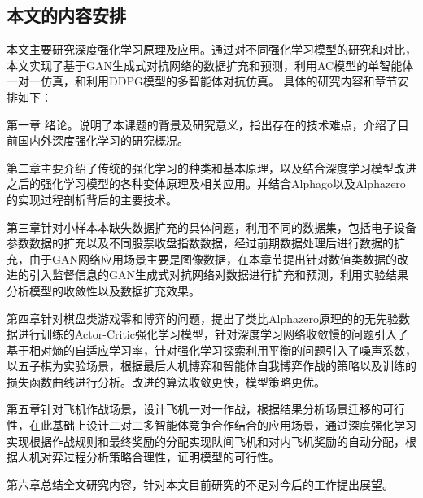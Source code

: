 \subsection{本文的内容安排}
本文主要研究深度强化学习原理及应用。通过对不同强化学习模型的研究和对比，本文实现了基于GAN生成式对抗网络的数据扩充和预测，利用AC模型的单智能体一对一仿真，和利用DDPG模型的多智能体对抗仿真。
具体的研究内容和章节安排如下：

第一章 绪论。说明了本课题的背景及研究意义，指出存在的技术难点，介绍了目前国内外深度强化学习的研究概况。

第二章主要介绍了传统的强化学习的种类和基本原理，以及结合深度学习模型改进之后的强化学习模型的各种变体原理及相关应用。并结合Alphago以及Alphazero的实现过程剖析背后的主要技术。

第三章针对小样本本缺失数据扩充的具体问题，利用不同的数据集，包括电子设备参数数据的扩充以及不同股票收盘指数数据，经过前期数据处理后进行数据的扩充，由于GAN网络应用场景主要是图像数据，在本章节提出针对数值类数据的改进的引入监督信息的GAN生成式对抗网络对数据进行扩充和预测，利用实验结果分析模型的收敛性以及数据扩充效果。

第四章针对棋盘类游戏零和博弈的问题，提出了类比Alphazero原理的的无先验数据进行训练的Actor-Critic强化学习模型，针对深度学习网络收敛慢的问题引入了基于相对熵的自适应学习率，针对强化学习探索利用平衡的问题引入了噪声系数，以五子棋为实验场景，根据最后人机博弈和智能体自我博弈作战的策略以及训练的损失函数曲线进行分析。改进的算法收敛更快，模型策略更优。

第五章针对飞机作战场景，设计飞机一对一作战，根据结果分析场景迁移的可行性，在此基础上设计二对二多智能体竞争合作结合的应用场景，通过深度强化学习实现根据作战规则和最终奖励的分配实现队间飞机和对内飞机奖励的自动分配，根据人机对弈过程分析策略合理性，证明模型的可行性。

第六章总结全文研究内容，针对本文目前研究的不足对今后的工作提出展望。
